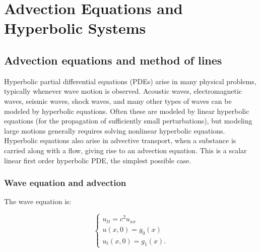 \part{Advection Equations and Hyperbolic Systems}

\chapter{Advection equations and method of lines}
Hyperbolic partial differential equations (PDEs) arise in many physical problems, typically whenever wave motion is observed. Acoustic waves, electromagnetic waves, seismic waves, shock waves, and many other types of waves can be modeled by hyperbolic equations. Often these are modeled by linear hyperbolic equations (for the propagation of sufficiently small perturbations), but modeling large motions generally requires solving nonlinear hyperbolic equations. Hyperbolic equations also arise in advective transport, when a substance is carried along with a flow, giving rise to an advection equation. This is a scalar linear first order hyperbolic PDE, the simplest possible case.

\section{Wave equation and advection}
The wave equation is: 

\begin{example}
\label{eg: Wave equation in 1d}
\begin{equation}
\label{eq: wave equa 1d}
    \begin{cases}
        u_{tt}=c^{2} u_{xx}  \\
        u(x,0) = g_0(x) \\ 
        u_t(x,0) = g_1(x).  
    \end{cases}
\end{equation}
\end{example}

